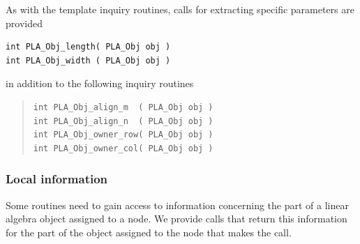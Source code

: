 As with the template inquiry routines, calls for extracting specific parameters are provided
\begin{FlaSpec}
\begin{verbatim}
int PLA_Obj_length( PLA_Obj obj )
int PLA_Obj_width ( PLA_Obj obj )
\end{verbatim}
\end{FlaSpec}
in addition to the following inquiry routines
\begin{quote}
\begin{verbatim}
int PLA_Obj_align_m  ( PLA_Obj obj )
int PLA_Obj_align_n  ( PLA_Obj obj )
int PLA_Obj_owner_row( PLA_Obj obj )
int PLA_Obj_owner_col( PLA_Obj obj )
\end{verbatim}
\end{quote}


\subsubsection{Local information}

Some routines need to gain access to information concerning
the part of a linear algebra object assigned to a node.
We provide calls that return this information
for the part of the object assigned to the node that
makes the call.

